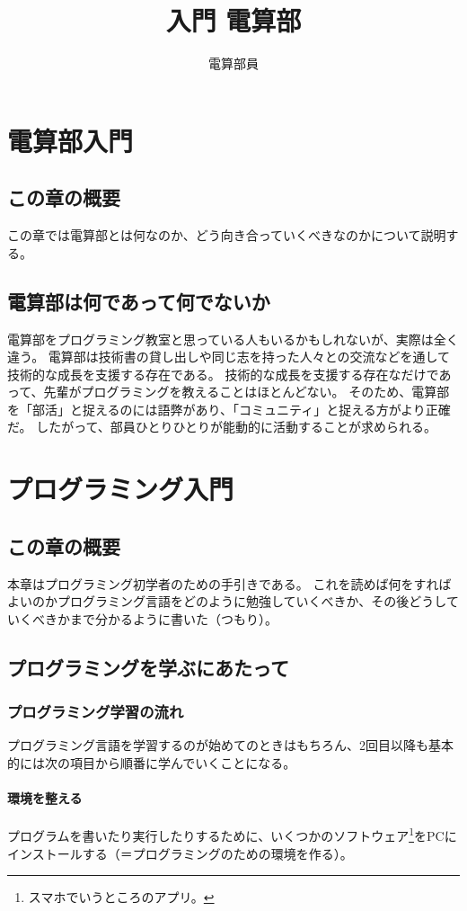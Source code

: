\documentclass[lualatex,ja=standard,12pt,a4j]{bxjsbook}
\title{入門 電算部}
\author{電算部員}
\begin{document}
	\tableofcontents
	\chapter{電算部入門}
		\section{この章の概要}
			この章では電算部とは何なのか、どう向き合っていくべきなのかについて説明する。
		\section{電算部は何であって何でないか}
			電算部をプログラミング教室と思っている人もいるかもしれないが、実際は全く違う。
			電算部は技術書の貸し出しや同じ志を持った人々との交流などを通して技術的な成長を支援する存在である。
			技術的な成長を支援する存在なだけであって、先輩がプログラミングを教えることはほとんどない。
			そのため、電算部を「部活」と捉えるのには語弊があり、「コミュニティ」と捉える方がより正確だ。
			したがって、部員ひとりひとりが能動的に活動することが求められる。
	\chapter{プログラミング入門}
		\section{この章の概要}
                本章はプログラミング初学者のための手引きである。
                これを読めば何をすればよいのかプログラミング言語をどのように勉強していくべきか、その後どうしていくべきかまで分かるように書いた（つもり）。
		\section{プログラミングを学ぶにあたって}
			\subsection{プログラミング学習の流れ}
				プログラミング言語を学習するのが始めてのときはもちろん、2回目以降も基本的には次の項目から順番に学んでいくことになる。
				\subsubsection{環境を整える}
					プログラムを書いたり実行したりするために、いくつかのソフトウェア\footnote{スマホでいうところのアプリ。}をPCにインストールする（＝プログラミングのための環境を作る）。
	                
\end{document}
